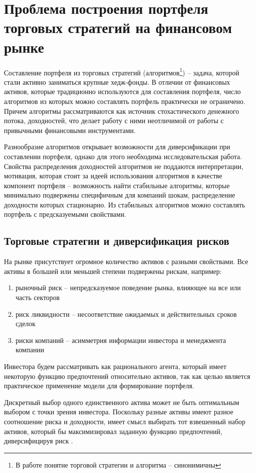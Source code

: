 \chapter{Проблема построения портфеля торговых стратегий на финансовом рынке}
Составление портфеля из торговых стратегий (алгоритмов\footnote{В работе понятие торговой стратегии и алгоритма -- синонимичны}) -- задача, которой стали активно заниматься крупные хедж-фонды. В отличии от финансовых активов, которые традиционно используются для составления портфеля, число алгоритмов из которых можно составлять портфель практически не ограничено. Причем алгоритмы рассматриваются как источник стохастического денежного потока, доходностей, что делает работу с ними неотличимой от работы с привычными финансовыми инструментами.

Разнообразие алгоритмов открывает возможности для диверсификации при составлении портфеля, однако для этого необходима исследовательская работа. Свойства распределения доходностей алгоритмов не поддаются интерпретации, мотивация, которая стоит за идеей использования алгоритмов в качестве компонент портфеля -- возможность найти стабильные алгоритмы, которые минимально подвержены специфичным для компаний шокам, распределение доходности которых стационарно. Из стабильных алгоритмов можно составлять портфель с предсказуемыми свойствами. 

\section{Торговые стратегии и диверсификация рисков}
На рынке присутствует огромное количество активов с разными свойствами. Все активы в большей или меньшей степени подвержены рискам, например:
\begin{enumerate}
	\item рыночный риск -- непредсказуемое поведение рынка, влияющее на все или часть секторов
	\item риск ликвидности -- несоответствие ожидаемых и действительных сроков сделок
	\item риски компаний -- асимметрия информации инвестора и менеджмента компании
\end{enumerate}
Инвестора будем рассматривать как рационального агента, который имеет некоторую функцию предпочтений относительно активов, так как целью является практическое применение модели для формирование портфеля. 

Дискретный выбор одного единственного актива может не быть оптимальным выбором с точки зрения инвестора. Поскольку разные активы имеют разное соотношение риска и доходности, имеет смысл выбирать тот взвешенный набор активов, который бы максимизировал заданную функцию предпочтений, диверсифицируя риск \citep{markovitz1959}.


